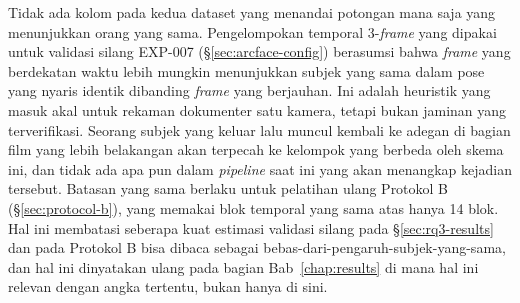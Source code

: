 Tidak ada kolom pada kedua dataset yang menandai potongan mana saja yang menunjukkan orang yang sama. Pengelompokan temporal 3-\textit{frame} yang dipakai untuk validasi silang EXP-007 (\S\ref{sec:arcface-config}) berasumsi bahwa \textit{frame} yang berdekatan waktu lebih mungkin menunjukkan subjek yang sama dalam pose yang nyaris identik dibanding \textit{frame} yang berjauhan. Ini adalah heuristik yang masuk akal untuk rekaman dokumenter satu kamera, tetapi bukan jaminan yang terverifikasi. Seorang subjek yang keluar lalu muncul kembali ke adegan di bagian film yang lebih belakangan akan terpecah ke kelompok yang berbeda oleh skema ini, dan tidak ada apa pun dalam \textit{pipeline} saat ini yang akan menangkap kejadian tersebut. Batasan yang sama berlaku untuk pelatihan ulang Protokol B (\S\ref{sec:protocol-b}), yang memakai blok temporal yang sama atas hanya 14 blok. Hal ini membatasi seberapa kuat estimasi validasi silang pada \S\ref{sec:rq3-results} dan pada Protokol B bisa dibaca sebagai bebas-dari-pengaruh-subjek-yang-sama, dan hal ini dinyatakan ulang pada bagian Bab~\ref{chap:results} di mana hal ini relevan dengan angka tertentu, bukan hanya di sini.
